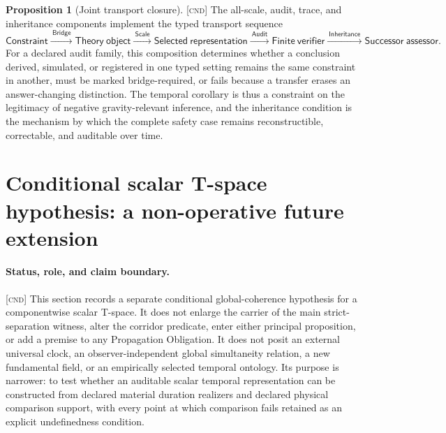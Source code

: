 \documentclass[11pt]{article}
\newcommand{\Cnd}{\textsc{[cnd]}}
\theoremstyle{definition}
\newtheorem{sproposition}{Proposition}
\begin{document}
\begin{sproposition}[Joint transport closure]
\label{prop:joint-transport-closure}
\Cnd{} The all-scale, audit, trace, and inheritance components implement the typed
transport sequence
\begin{equation}
\mathsf{Constraint}
\xrightarrow{\ \mathsf{Bridge}\ }
\mathsf{Theory\ object}
\xrightarrow{\ \mathsf{Scale}\ }
\mathsf{Selected\ representation}
\xrightarrow{\ \mathsf{Audit}\ }
\mathsf{Finite\ verifier}
\xrightarrow{\ \mathsf{Inheritance}\ }
\mathsf{Successor\ assessor}.
\label{eq:joint-transport}
\end{equation}
For a declared audit family, this composition determines whether a conclusion
derived, simulated, or registered in one typed setting remains the same constraint
in another, must be marked bridge-required, or fails because a transfer erases an
answer-changing distinction. The temporal corollary is thus a constraint on the
legitimacy of negative gravity-relevant inference, and the inheritance condition is
the mechanism by which the complete safety case remains reconstructible,
correctable, and auditable over time.
\end{sproposition}

\section{Conditional scalar T-space hypothesis: a non-operative future extension}
\label{supp:tspace}

\paragraph{Status, role, and claim boundary.}
\Cnd{} This section records a separate conditional global-coherence hypothesis
for a componentwise scalar T-space. It does not enlarge the carrier of the main
strict-separation witness, alter the corridor predicate, enter either principal
proposition, or add a premise to any Propagation Obligation. It does not posit an
external universal clock, an observer-independent global simultaneity relation, a
new fundamental field, or an empirically selected temporal ontology. Its purpose
is narrower: to test whether an auditable scalar temporal representation can be
constructed from declared material duration realizers and declared physical
comparison support, with every point at which comparison fails retained as an
explicit undefinedness condition.
\end{document}
